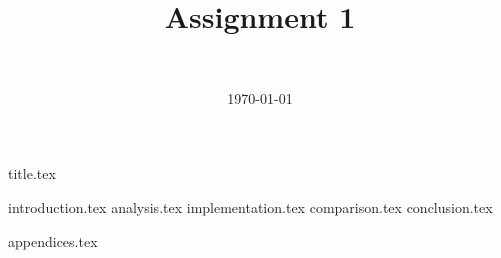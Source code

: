 \documentclass[final]{article}
\title{Assignment 1}
\author{~}
\date{\today}
\begin{document}

{title.tex}
\newpage

{introduction.tex}
{analysis.tex}
{implementation.tex}
{comparison.tex}
{conclusion.tex}
\newpage
{}

\printbibliography
{appendices.tex}
\end{document}
